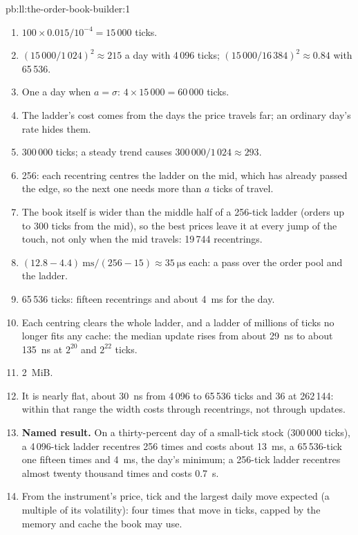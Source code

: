 \begin{solution}{pb:ll:the-order-book-builder:1}
\begin{enumerate}
\item $100 \times 0.015 / 10^{-4} = 15\,000$ ticks.
\item $(15\,000/1\,024)^2 \approx 215$ a day with 4\,096 ticks; $(15\,000/16\,384)^2 \approx 0.84$ with 65\,536.
\item One a day when $a = \sigma$: $4 \times 15\,000 = 60\,000$ ticks.
\item The ladder's cost comes from the days the price travels far; an ordinary day's rate hides them.
\item 300\,000 ticks; a steady trend causes $300\,000/1\,024 \approx 293$.
\item 256: each recentring centres the ladder on the mid, which has already passed the edge, so the next one needs more than
$a$ ticks of travel.
\item The book itself is wider than the middle half of a 256-tick ladder (orders up to 300 ticks from the mid), so the best
prices leave it at every jump of the touch, not only when the mid travels: 19\,744 recentrings.
\item $(12.8 - 4.4)~\text{ms}/(256 - 15) \approx \qty{35}{\micro\second}$ each: a pass over the order pool and the ladder.
\item 65\,536 ticks: fifteen recentrings and about \qty{4}{\milli\second} for the day.
\item Each centring clears the whole ladder, and a ladder of millions of ticks no longer fits any cache: the median update
rises from about \qty{29}{\nano\second} to about \qty{135}{\nano\second} at $2^{20}$ and $2^{22}$ ticks.
\item 2~MiB.
\item It is nearly flat, about \qty{30}{\nano\second} from 4\,096 to 65\,536 ticks and 36 at 262\,144: within that range the width costs through
recentrings, not through updates.
\item \textbf{Named result.} On a thirty-percent day of a small-tick stock (300\,000 ticks), a 4\,096-tick ladder recentres
256 times and costs about \qty{13}{\milli\second}, a 65\,536-tick one fifteen times and \qty{4}{\milli\second}, the day's
minimum; a 256-tick ladder recentres almost twenty thousand times and costs \qty{0.7}{\second}.
\item From the instrument's price, tick and the largest daily move expected (a multiple of its volatility): four times that
move in ticks, capped by the memory and cache the book may use.

\end{enumerate}
\end{solution}
